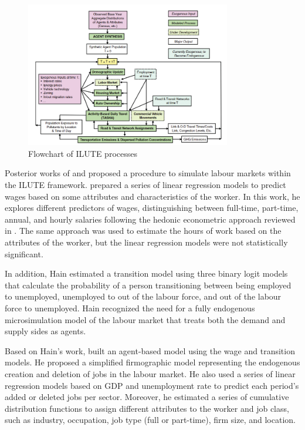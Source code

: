 \begin{figure}[h]
    \centering
    \includegraphics[width=0.8\textwidth]{images/ch2_ilute/ilute.png}
    \caption{Flowchart of ILUTE processes \citep{Miller2021}}
    \label{fig:ilute}
\end{figure}

Posterior works of \citet{Hain2010} and \citet{Harmon2013} proposed a procedure to simulate labour markets within the ILUTE framework. \citet{Hain2010} prepared a series of linear regression models to predict wages based on some attributes and characteristics of the worker. In this work, he explores different predictors of wages, distinguishing between full-time, part-time, annual, and hourly salaries following the hedonic econometric approach reviewed in . The same approach was used to estimate the hours of work based on the attributes of the worker, but the linear regression models were not statistically significant.

In addition, Hain estimated a transition model using three binary logit models that calculate the probability of a person transitioning between being employed to unemployed, unemployed to out of the labour force, and out of the labour force to unemployed. Hain recognized the need for a fully endogenous microsimulation model of the labour market that treats both the demand and supply sides as agents. 

Based on Hain's work, \citet{Harmon2013} built an agent-based model using the wage and transition models. He proposed a simplified firmographic model representing the endogenous creation and deletion of jobs in the labour market. He also used a series of linear regression models based on GDP and unemployment rate to predict each period's added or deleted jobs per sector. Moreover, he estimated a series of cumulative distribution functions to assign different attributes to the worker and job class, such as industry, occupation, job type (full or part-time), firm size, and location. 

